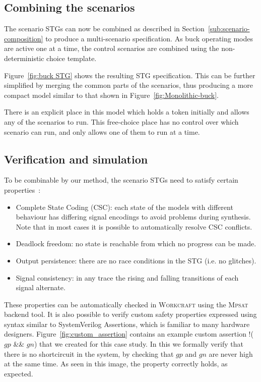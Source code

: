 \documentclass[british, journal]{IEEEtran}
\newcommand{\noun}[1]{\textsc{#1}}
\begin{document}
\subsection{Combining the scenarios }

The scenario STGs can now be combined as described in Section~\ref{sub:scenario-composition}
to produce a multi-scenario specification. As buck operating modes are active one at a
time, the control scenarios are combined using the non-deterministic choice template.

Figure~\ref{fig:buck STG} shows the resulting STG specification. This can be
further simplified by merging the common parts of the scenarios, thus producing
a more compact model similar to that shown in Figure~\ref{fig:Monolithic-buck}.

There is an explicit place in this model which holds a token initially
and allows any of the scenarios to run. This free-choice place has no
control over which scenario can run, and only allows one of
them to run at a time.


\subsection{Verification and simulation}

To be combinable by our method, the scenario STGs need to satisfy certain
properties~\cite{Cortadella}:
\begin{itemize}
\item Complete State Coding (CSC): each state of the models with different
behaviour has differing signal encodings to avoid problems during
synthesis. Note that in most cases it is possible to automatically
resolve CSC conflicts.
\item Deadlock freedom: no state is reachable from which no progress can
be made.
\item Output persistence: there are no race conditions in the STG (i.e. no glitches).
\item Signal consistency: in any trace the rising and falling transitions of
each signal alternate.
\end{itemize}
These properties can be automatically checked in \noun{Workcraft} using
the \noun{Mpsat}~\cite{khomenko2004detecting} backend tool.
It is also possible to verify custom safety properties expressed using
syntax similar to SystemVerilog Assertions, which is familiar to many
hardware designers.
Figure~\ref{fig:custom_assertion} contains an example custom assertion
\textsf{!($gp$ \&\& $gn$)} that we created for this case study.
In this we formally verify that there is no shortcircuit in the system, by
checking that $gp$ and $gn$ are never high at the same time.
As seen in this image, the property correctly holds, as expected.
\end{document}
